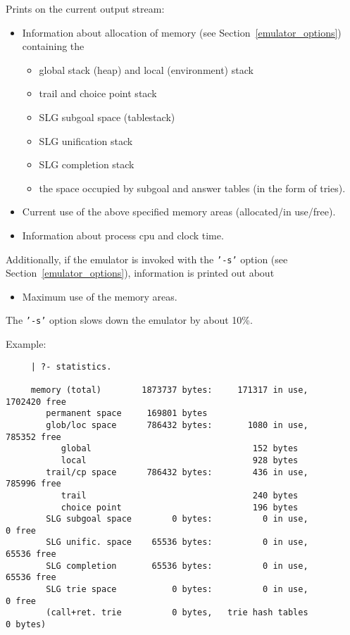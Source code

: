\begin{description}
    Prints on the current output stream:
    \begin{itemize}
    \item Information about allocation of memory 
	  (see Section~\ref{emulator_options}) containing the 
          \begin{itemize}
          \item global stack (heap) and local (environment) stack
          \item trail and choice point stack
	  \item SLG subgoal space (tablestack)
          \item SLG unification stack
          \item SLG completion stack
	  \item the space occupied by subgoal and answer tables
		(in the form of tries).
          \end{itemize}
    \item Current use of the above specified memory areas
		(allocated/in use/free).
    \item Information about process cpu and clock time.
    \end{itemize}

    Additionally, if the emulator is invoked with the {\tt '-s'} option
    (see Section~\ref{emulator_options}), information is printed out about
    \begin{itemize}
    \item Maximum use of the memory areas.
    \end{itemize}
    The {\tt '-s'} option slows down the emulator by about 10\%.

    Example:
    {\footnotesize
     \begin{verbatim}
     | ?- statistics.

     memory (total)        1873737 bytes:     171317 in use,    1702420 free
        permanent space     169801 bytes
        glob/loc space      786432 bytes:       1080 in use,     785352 free
           global                                152 bytes
           local                                 928 bytes
        trail/cp space      786432 bytes:        436 in use,     785996 free
           trail                                 240 bytes
           choice point                          196 bytes
        SLG subgoal space        0 bytes:          0 in use,          0 free
        SLG unific. space    65536 bytes:          0 in use,      65536 free
        SLG completion       65536 bytes:          0 in use,      65536 free
        SLG trie space           0 bytes:          0 in use,          0 free
        (call+ret. trie          0 bytes,   trie hash tables          0 bytes)


\end{verbatim}}
\end{description}
